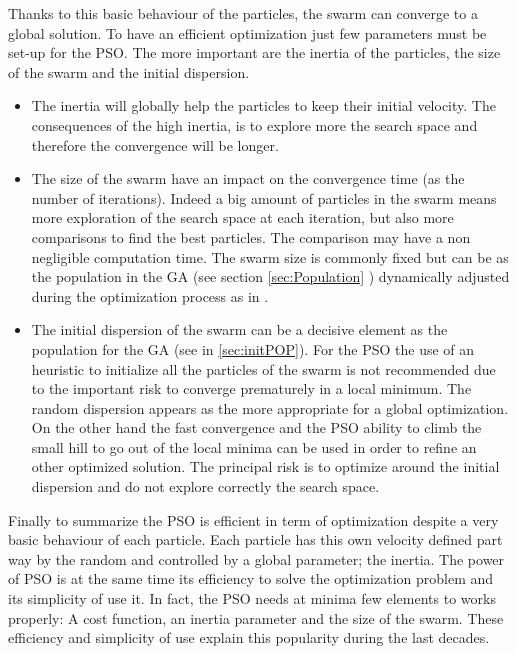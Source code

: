Thanks to this basic behaviour of the particles, the swarm can converge to a global solution. 
To have an efficient optimization just few parameters must be set-up for the PSO.  
The more important are the inertia of the particles, the size of the swarm and the initial dispersion.
\begin{itemize}
\item The inertia will globally help the particles to keep their initial velocity. The consequences of the high inertia, is to explore more the search space and therefore the convergence will be longer. 
\item The size of the swarm  have an impact on the convergence time (as the  number of iterations).  Indeed a big amount of particles in the swarm  means more exploration of the search space at each iteration, but also more comparisons to find the best particles. The comparison may have a non negligible computation time. 
The swarm size is commonly fixed but can be as the population in the GA (see section \ref{sec:Population} ) dynamically adjusted during the optimization process as in \cite{228*leong2008}. 

\item The initial dispersion of the swarm can be a decisive element as the population for the GA (see in \ref{sec:initPOP}). For the PSO the use of an heuristic to initialize all the particles of the swarm is not recommended due to the important risk to converge prematurely in a local minimum. The random dispersion appears as the more appropriate for a global optimization. On the other hand the fast convergence and the PSO ability to climb the small hill to go out of the local minima can be used in order to refine an other optimized solution. The principal risk is to optimize around the initial dispersion and do not explore correctly the search space.  
\end{itemize}

Finally to summarize the PSO is efficient in term of optimization despite a very basic behaviour of each  particle. Each particle has this own velocity defined part way by the random and controlled by a global parameter; the inertia.
 The power of PSO is at the same time its efficiency to solve the optimization problem and its simplicity of use it. In fact, the PSO needs at minima few elements to works properly:
 A cost function, an inertia parameter and the size of the swarm. These efficiency and simplicity of use explain this popularity during the last decades.
 





